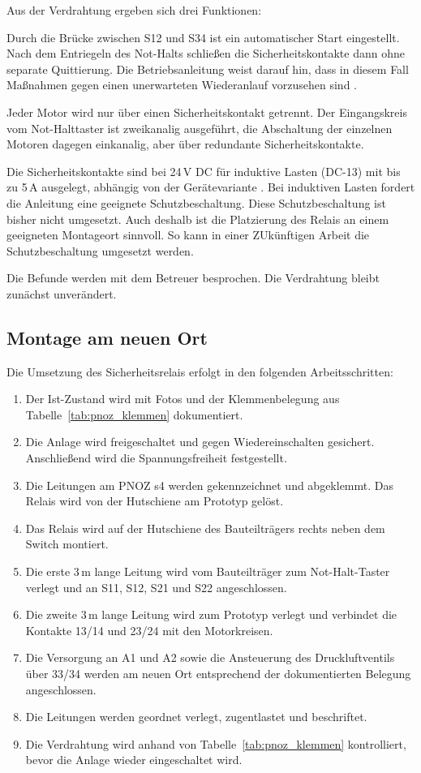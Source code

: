 Aus der Verdrahtung ergeben sich drei Funktionen:

Durch die Brücke zwischen S12 und S34 ist ein automatischer Start eingestellt. Nach dem Entriegeln des Not-Halts schließen die Sicherheitskontakte dann ohne separate Quittierung. Die Betriebsanleitung weist darauf hin, dass in diesem Fall Maßnahmen gegen einen unerwarteten Wiederanlauf vorzusehen sind \cite{pilz_pnoz_s4}. %


Jeder Motor wird nur über einen Sicherheitskontakt getrennt. Der Eingangskreis vom Not-Halttaster ist zweikanalig ausgeführt, die Abschaltung der einzelnen Motoren dagegen einkanalig, aber über redundante Sicherheitskontakte.

Die Sicherheitskontakte sind bei 24\,V DC für induktive Lasten (DC-13) mit bis zu 5\,A ausgelegt, abhängig von der Gerätevariante \cite{pilz_pnoz_s4}. Bei induktiven Lasten fordert die Anleitung eine geeignete Schutzbeschaltung. Diese Schutzbeschaltung ist bisher nicht umgesetzt. Auch deshalb ist die Platzierung des Relais an einem geeigneten Montageort sinnvoll. So kann in einer ZUkünftigen Arbeit die Schutzbeschaltung umgesetzt werden.

Die Befunde werden mit dem Betreuer besprochen. Die Verdrahtung bleibt zunächst unverändert.

\subsection{Montage am neuen Ort}

Die Umsetzung des Sicherheitsrelais erfolgt in den folgenden Arbeitsschritten:

\begin{enumerate}
  \item Der Ist-Zustand wird mit Fotos und der Klemmenbelegung aus Tabelle~\ref{tab:pnoz_klemmen} dokumentiert.
  \item Die Anlage wird freigeschaltet und gegen Wiedereinschalten gesichert. Anschließend wird die Spannungsfreiheit festgestellt.
  \item Die Leitungen am PNOZ s4 werden gekennzeichnet und abgeklemmt. Das Relais wird von der Hutschiene am Prototyp gelöst.
  \item Das Relais wird auf der Hutschiene des Bauteilträgers rechts neben dem Switch montiert.
  \item Die erste 3\,m lange Leitung wird vom Bauteilträger zum Not-Halt-Taster verlegt und an S11, S12, S21 und S22 angeschlossen.
  \item Die zweite 3\,m lange Leitung wird zum Prototyp verlegt und verbindet die Kontakte 13/14 und 23/24 mit den Motorkreisen.
  \item Die Versorgung an A1 und A2 sowie die Ansteuerung des Druckluftventils über 33/34 werden am neuen Ort entsprechend der dokumentierten Belegung angeschlossen.
  \item Die Leitungen werden geordnet verlegt, zugentlastet und beschriftet.
  \item Die Verdrahtung wird anhand von Tabelle~\ref{tab:pnoz_klemmen} kontrolliert, bevor die Anlage wieder eingeschaltet wird.
\end{enumerate}

